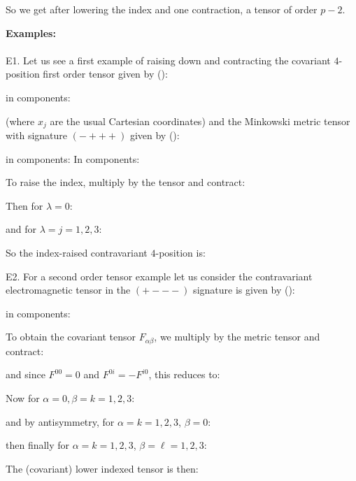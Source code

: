 	So we get after lowering the index and one contraction, a tensor of order $p-2$.
	\begin{tcolorbox}[colframe=black,colback=white,sharp corners]
	\textbf{{\Large {}}Examples:}\\\\
	E1. Let us see a first example of raising down and contracting the covariant $4$-position first order tensor given by ():
	
	in components:
	
	(where $x_j$ are the usual Cartesian coordinates) and the Minkowski metric tensor with signature $(-+++)$ given by ():
	
	in components:
	In components:
	
	To raise the index, multiply by the tensor and contract:
	
	Then for $\lambda = 0$:
	
	and for $\lambda = j = 1, 2, 3$:
	
	So the index-raised contravariant $4$-position is:
	
	\end{tcolorbox}
	
	\begin{tcolorbox}[colframe=black,colback=white,sharp corners]
	E2. For a second order tensor example let us consider the contravariant electromagnetic tensor in the $(+---)$ signature is given by ():
	
	in components:
	
	To obtain the covariant tensor $F_{\alpha\beta}$, we multiply by the metric tensor and contract:
	
	and since $F^{00} = 0$ and $F^{0i}=-F^{i0}$, this reduces to:
	
	Now for $\alpha = 0, \beta = k = 1, 2, 3$:
	
	and by antisymmetry, for $\alpha = k = 1, 2, 3$, $\beta = 0$:
	
	then finally for $\alpha = k = 1, 2, 3$, $\beta = \ell = 1, 2, 3$:
	
	The (covariant) lower indexed tensor is then:
	
	\end{tcolorbox}
	
